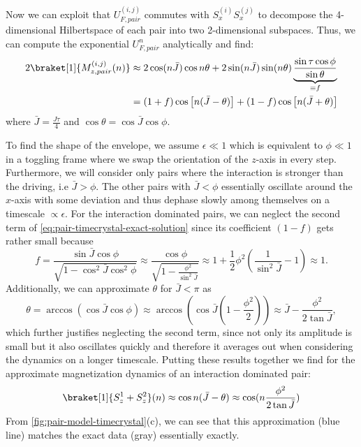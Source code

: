 Now we can exploit that $U_{F,pair}^{(i,j)}$ commutes with $S_x^{(i)}S_x^{(j)}$ to decompose the 4-dimensional Hilbertspace of each pair into two 2-dimensional subspaces. Thus, we can compute the exponential $U_{F,pair}^n$ analytically and find:
\begin{align}
	2\braket[1]{M^{(i,j)}_{z,pair}(n)} &\approx 2\cos(n\bar{J})\cos{n\theta} +
		2\sin(n\bar{J})\sin(n\theta)\underbrace{\frac{\sin\tau\cos\phi}{\sin\theta}}_{\equiv f}\\
	&= (1+f)\cos\left[ n(\bar{J}-\theta)\right] + (1-f)\cos\left[ n(\bar{J}+\theta)\right]\label{eq:pair-timecrystal-exact-solution}
\end{align}
where $\bar{J}=\frac{J\tau}{4}$ and $\cos\theta = \cos\bar{J}\cos\phi$.

To find the shape of the envelope, we assume $\epsilon\ll 1$ which is equivalent to $\phi \ll 1$ in a toggling frame where we swap the orientation of the $z$-axis in every step. Furthermore, we will consider only pairs where the interaction is stronger than the driving, i.e $\bar{J}>\phi$. The other pairs with $\bar{J}<\phi$ essentially oscillate around the $x$-axis with some deviation and thus dephase slowly among themselves on a timescale $\propto \epsilon$.
For the interaction dominated pairs, we can neglect the second term of \autoref{eq:pair-timecrystal-exact-solution} since its coefficient $(1-f)$ gets rather small because
\begin{equation}
	f = \frac{\sin\bar{J}\cos\phi}{\sqrt{1-\cos^2\bar{J}\cos^2\phi}}\approx \frac{\cos\phi}{\sqrt{1-\frac{\phi^2}{\sin^2\bar{J}}}}\approx 1+\frac{1}{2}\phi^2\left(\frac{1}{\sin^2\bar{J}}-1\right) \approx 1.
\end{equation}
Additionally, we can approximate $\theta$ for $\bar{J}<\pi$ as
\begin{equation}
	\theta = \arccos(\cos\bar{J}\cos\phi) \approx \arccos(\cos\bar{J}(1-\frac{\phi^2}{2}))\approx \bar{J} -\frac{\phi^2}{2\tan\bar{J}},
\end{equation}
which further justifies neglecting the second term, since not only its amplitude is small but it also oscillates quickly and therefore it averages out when considering the dynamics on a longer timescale.
Putting these results together we find for the approximate magnetization dynamics of an interaction dominated pair:
\begin{align}\label{eq:mz-interaction-dominated}
	\braket[1]{S_z^1+S_z^2}(n) \approx \cos n(\bar{J}-\theta) \approx \cos(n\frac{\phi^2}{2\tan\bar{J}})
\end{align}
From \autoref{fig:pair-model-timecrystal}(c), we can see that this approximation (blue line) matches the exact data (gray) essentially exactly.

